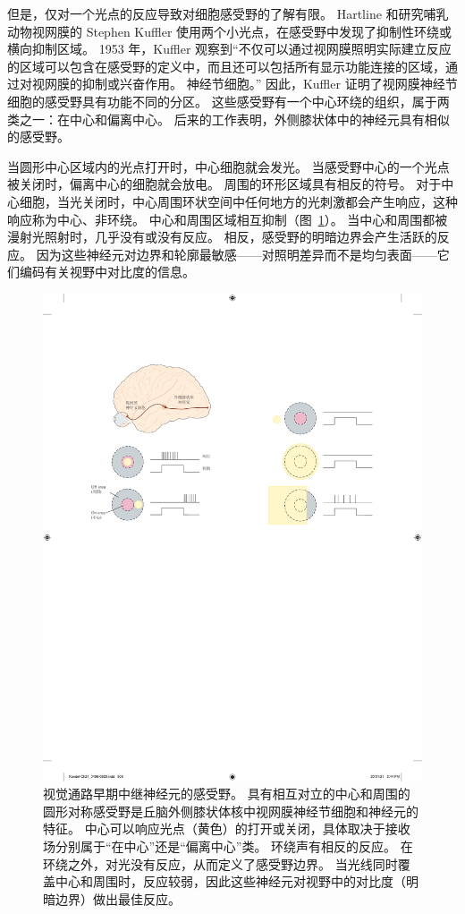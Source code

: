 但是，仅对一个光点的反应导致对细胞感受野的了解有限。
Hartline 和研究哺乳动物视网膜的 Stephen Kuffler 使用两个小光点，在感受野中发现了抑制性环绕或横向抑制区域。
1953 年，Kuffler 观察到“不仅可以通过视网膜照明实际建立反应的区域可以包含在感受野的定义中，而且还可以包括所有显示功能连接的区域，通过对视网膜的抑制或兴奋作用。
神经节细胞。” 
因此，Kuffler 证明了视网膜神经节细胞的感受野具有功能不同的分区。
这些感受野有一个中心环绕的组织，属于两类之一：在中心和偏离中心。
后来的工作表明，外侧膝状体中的神经元具有相似的感受野。


当圆形中心区域内的光点打开时，中心细胞就会发光。
当感受野中心的一个光点被关闭时，偏离中心的细胞就会放电。
周围的环形区域具有相反的符号。 
对于中心细胞，当光关闭时，中心周围环状空间中任何地方的光刺激都会产生响应，这种响应称为中心、非环绕。 
中心和周围区域相互抑制（图~\ref{fig:21_9}）。
当中心和周围都被漫射光照射时，几乎没有或没有反应。 
相反，感受野的明暗边界会产生活跃的反应。
因为这些神经元对边界和轮廓最敏感——对照明差异而不是均匀表面——它们编码有关视野中对比度的信息。


\begin{figure}[htbp]
	\centering
	\includegraphics[width=1.0\linewidth]{chap21/fig_21_9}
	\caption{视觉通路早期中继神经元的感受野。
		具有相互对立的中心和周围的圆形对称感受野是丘脑外侧膝状体核中视网膜神经节细胞和神经元的特征。
		中心可以响应光点（黄色）的打开或关闭，具体取决于接收场分别属于“在中心”还是“偏离中心”类。
		环绕声有相反的反应。
		在环绕之外，对光没有反应，从而定义了感受野边界。
		当光线同时覆盖中心和周围时，反应较弱，因此这些神经元对视野中的对比度（明暗边界）做出最佳反应。}
	\label{fig:21_9}
\end{figure}


